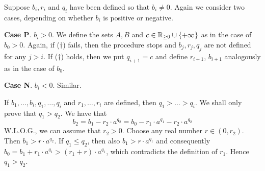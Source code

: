 \documentclass[11pt]{article}
\begin{document}
\begin{center}
\quad
{}
\end{center}

Suppose  \(b_i,r_i\) and \(q_i\) have been defined so that \(b_i\neq 0\). Again we consider two cases,
depending on whether \(b_i\) is positive or negative.

\textbf{Case P}. \(b_i>0\). We define the sets \(A,B\) and \(c\in\mathbb{R}_{\ge 0}\cup\{+\infty\}\) as in the case of \(b_0>0\).
Again, if (\(\dagger\)) fails, then the procedure stops and \(b_j,r_j,q_j\) are not defined for
any \(j>i\). If (\(\dagger\)) holds, then we put \(q_{i+1}=c\) and define \(r_{i+1}\), \(b_{i+1}\)
analogously as in the case of \(b_0\).

\textbf{Case N}. \(b_i<0\). Similar.

If \(b_1,\dots,b_i,q_1,\dots,q_i\) and \(r_1,\dots,r_i\) are defined, then \(q_1>\dots>q_i\). We shall only prove
that \(q_1>q_2\). We have that
\begin{equation*}
b_2=b_1-r_2\cdot a^{q_2}=b_0-r_1\cdot a^{q_1}-r_2\cdot a^{q_2}
\end{equation*}
W.L.O.G., we can assume that \(r_2>0\). Choose any real number \(r\in(0,r_2)\).
Then \(b_1>r\cdot a^{q_2}\). If \(q_1\le q_2\), then also \(b_1>r\cdot a^{q_1}\) and
consequently \(b_0=b_1+r_1\cdot a^{q_1}>(r_1+r)\cdot a^{q_1}\), which contradicts the definition of \(r_1\).
Hence \(q_1>q_2\).
\end{document}
